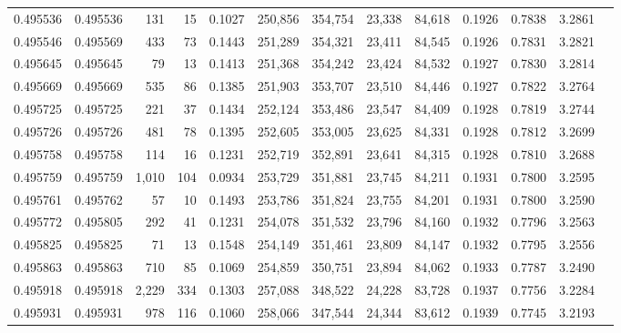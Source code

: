 \begin{tabular}{rrrrrrrrrrrrr}
0.495536 & 0.495536 &   131 &    15 &                                     0.1027 & 250,856 & 354,754 &  23,338 &  84,618 & 0.1926 & 0.7838 & 3.2861 \\
0.495546 & 0.495569 &   433 &    73 &                                     0.1443 & 251,289 & 354,321 &  23,411 &  84,545 & 0.1926 & 0.7831 & 3.2821 \\
0.495645 & 0.495645 &    79 &    13 &                                     0.1413 & 251,368 & 354,242 &  23,424 &  84,532 & 0.1927 & 0.7830 & 3.2814 \\
0.495669 & 0.495669 &   535 &    86 &                                     0.1385 & 251,903 & 353,707 &  23,510 &  84,446 & 0.1927 & 0.7822 & 3.2764 \\
0.495725 & 0.495725 &   221 &    37 &                                     0.1434 & 252,124 & 353,486 &  23,547 &  84,409 & 0.1928 & 0.7819 & 3.2744 \\
0.495726 & 0.495726 &   481 &    78 &                                     0.1395 & 252,605 & 353,005 &  23,625 &  84,331 & 0.1928 & 0.7812 & 3.2699 \\
0.495758 & 0.495758 &   114 &    16 &                                     0.1231 & 252,719 & 352,891 &  23,641 &  84,315 & 0.1928 & 0.7810 & 3.2688 \\
0.495759 & 0.495759 & 1,010 &   104 &                                     0.0934 & 253,729 & 351,881 &  23,745 &  84,211 & 0.1931 & 0.7800 & 3.2595 \\
0.495761 & 0.495762 &    57 &    10 &                                     0.1493 & 253,786 & 351,824 &  23,755 &  84,201 & 0.1931 & 0.7800 & 3.2590 \\
0.495772 & 0.495805 &   292 &    41 &                                     0.1231 & 254,078 & 351,532 &  23,796 &  84,160 & 0.1932 & 0.7796 & 3.2563 \\
0.495825 & 0.495825 &    71 &    13 &                                     0.1548 & 254,149 & 351,461 &  23,809 &  84,147 & 0.1932 & 0.7795 & 3.2556 \\
0.495863 & 0.495863 &   710 &    85 &                                     0.1069 & 254,859 & 350,751 &  23,894 &  84,062 & 0.1933 & 0.7787 & 3.2490 \\
0.495918 & 0.495918 & 2,229 &   334 &                                     0.1303 & 257,088 & 348,522 &  24,228 &  83,728 & 0.1937 & 0.7756 & 3.2284 \\
0.495931 & 0.495931 &   978 &   116 &                                     0.1060 & 258,066 & 347,544 &  24,344 &  83,612 & 0.1939 & 0.7745 & 3.2193 \\

\end{tabular}
